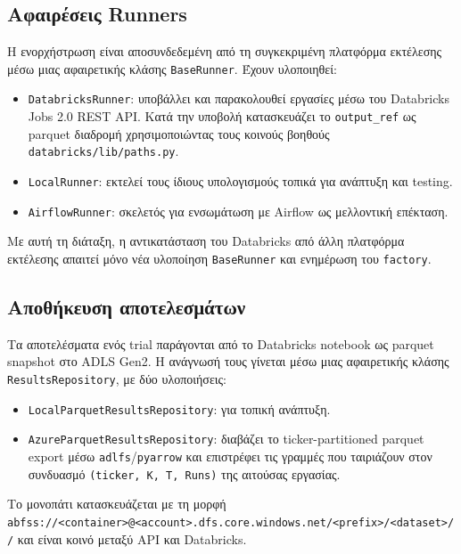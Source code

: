 \documentclass[12pt]{article}
\begin{document}
\subsection{Αφαιρέσεις Runners}
Η ενορχήστρωση είναι αποσυνδεδεμένη από τη συγκεκριμένη πλατφόρμα εκτέλεσης μέσω μιας αφαιρετικής κλάσης \texttt{BaseRunner}. Έχουν υλοποιηθεί:
\begin{itemize}
  \item \texttt{DatabricksRunner}: υποβάλλει και παρακολουθεί εργασίες μέσω του Databricks Jobs 2.0 REST API. Κατά την υποβολή κατασκευάζει το \texttt{output\_ref} ως parquet διαδρομή χρησιμοποιώντας τους κοινούς βοηθούς \texttt{databricks/lib/paths.py}.
  \item \texttt{LocalRunner}: εκτελεί τους ίδιους υπολογισμούς τοπικά για ανάπτυξη και testing.
  \item \texttt{AirflowRunner}: σκελετός για ενσωμάτωση με Airflow ως μελλοντική επέκταση.
\end{itemize}
Με αυτή τη διάταξη, η αντικατάσταση του Databricks από άλλη πλατφόρμα εκτέλεσης απαιτεί μόνο νέα υλοποίηση \texttt{BaseRunner} και ενημέρωση του \texttt{factory}.



\subsection{Αποθήκευση αποτελεσμάτων}
Τα αποτελέσματα ενός trial παράγονται από το Databricks notebook ως parquet snapshot στο ADLS Gen2. Η ανάγνωσή τους γίνεται μέσω μιας αφαιρετικής κλάσης \texttt{ResultsRepository}, με δύο υλοποιήσεις:
\begin{itemize}
  \item \texttt{LocalParquetResultsRepository}: για τοπική ανάπτυξη.
  \item \texttt{AzureParquetResultsRepository}: διαβάζει το ticker-partitioned parquet export μέσω \texttt{adlfs}/\texttt{pyarrow} και επιστρέφει τις γραμμές που ταιριάζουν στον συνδυασμό \texttt{(ticker, K, T, Runs)} της αιτούσας εργασίας.
\end{itemize}
Το μονοπάτι κατασκευάζεται με τη μορφή \texttt{abfss://\allowbreak<container>\allowbreak @\allowbreak<account>\allowbreak.dfs\allowbreak.core\allowbreak.windows\allowbreak.net/\allowbreak<prefix>/\allowbreak<dataset>/\allowbreak[ticker=<TICKER>]/} και είναι κοινό μεταξύ API και Databricks.
\end{document}
